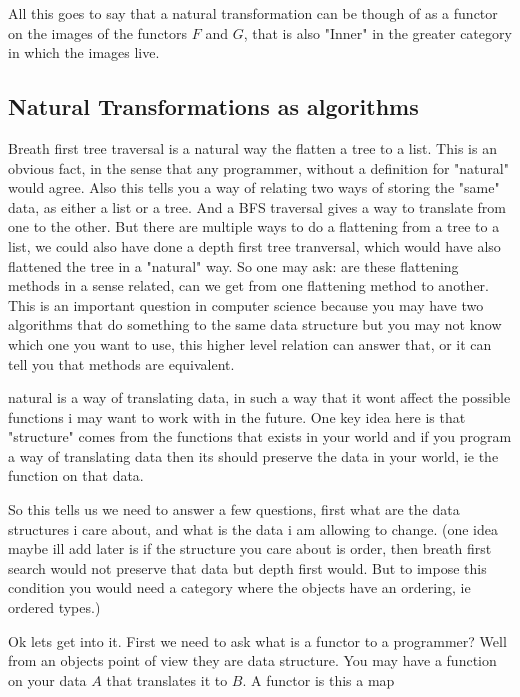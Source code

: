 \documentclass[12pt]{amsart}
\begin{document}
All this goes to say that a natural transformation can be though of as a functor on the images of the functors $F$ and $G$, 
that is also "Inner" in the greater category in which the images live.%


\subsection*{Natural Transformations as algorithms}
Breath first tree traversal is a natural way the flatten a tree to a list. This is an obvious fact, 
in the sense that any programmer, without a definition for "natural" would agree.
Also this tells you a way of relating two ways of storing the "same" data, as either 
a list or a tree. And a BFS traversal gives a way to translate from one to the other.
But there are multiple ways to do a flattening from a tree to a list, we could also have done a depth first tree tranversal,
which would have also flattened the tree in a "natural" way. So one may ask: are these flattening methods in a sense related, 
can we get from one flattening method to another. This is an important question in computer science because you may have two 
algorithms that do something to the same data structure but you may not know which one you want to use, this higher 
level relation can answer that, or it can tell you that methods are equivalent.

natural is a way of translating data, in such a way that it wont affect the possible functions i may want to work with in the future. 
One key idea here is that "structure" comes from the functions that exists in your 
world and if you program a way of translating data then its should preserve the data in your world, ie the function on that data.

So this tells us we need to answer a few questions, first what are the data structures i care about, and what is the data i am allowing to change.
(one idea maybe ill add later is if the structure you care about is order, then breath first 
search would not preserve that data but depth first would. But to impose this condition you would need a category where the objects 
have an ordering, ie ordered types.)

Ok lets get into it. First we need to ask what is a functor to a programmer? Well from an 
objects point of view they are data structure. You may have a function on your data $A$ that translates it to $B$.
A functor is this a map
\end{document}
